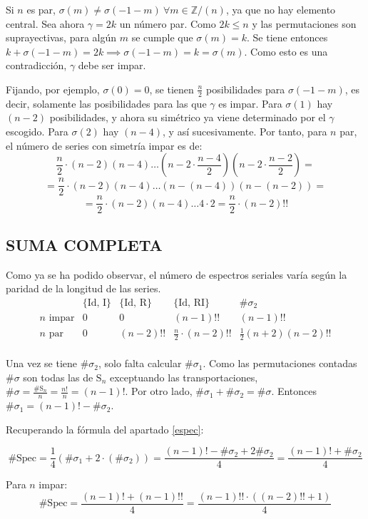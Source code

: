 		Si $n$ es par, $\sigma(m)\neq\sigma(-1-m)\ \forall m\in \mathbb{Z} / (n)$, ya que no hay elemento central. Sea ahora $\gamma=2k$ un número par. Como $2k\leq n$ y las permutaciones son suprayectivas, para algún $m$ se cumple que $\sigma(m)=k$. Se tiene entonces $k+\sigma(-1-m)=2k\implies\sigma(-1-m)=k=\sigma(m)$. Como esto es una contradicción, $\gamma$ debe ser impar.
		
		Fijando, por ejemplo, $\sigma(0)=0$, se tienen $\frac{n}{2}$ posibilidades para $\sigma(-1-m)$, es decir, solamente las posibilidades para las que $\gamma$ es impar. Para $\sigma(1)$ hay $(n-2)$ posibilidades, y ahora su simétrico ya viene determinado por el $\gamma$ escogido. Para $\sigma(2)$ hay $(n-4)$, y así sucesivamente. \cite{reiner} Por tanto, para $n$ par, el número de series con simetría impar es de: 
		$$\frac{n}{2}\cdot(n-2)(n-4)\ldots(n-2\cdot\frac{n-4}{2})(n-2\cdot\frac{n-2}{2})=$$
		$$=\frac{n}{2}\cdot(n-2)(n-4)\ldots(n-(n-4))(n-(n-2))=$$
		$$=\frac{n}{2}\cdot(n-2)(n-4)\ldots4\cdot2=\frac{n}{2}\cdot(n-2)!!$$
			\newpage
	\subsection{SUMA COMPLETA}
		\def\arraystretch{1.5}
		Como ya se ha podido observar, el número de espectros seriales varía según la paridad de la longitud de las series.		
		$$\begin{array}{c|c|c|c|c}
		&\{\text{Id, I}\}&\{\text{Id, R}\}&\{\text{Id, RI}\}&\#\sigma_2\\\hline
		n\text{ impar}&0&0&(n-1)!!&(n-1)!!\\\hline
		n\text{ par}&0&(n-2)!!&\frac{n}{2}\cdot(n-2)!!&\frac{1}{2}(n+2)(n-2)!!\\
		\end{array}$$
		\def\arraystretch{1}
		
		Una vez se tiene $\#\sigma_2$, solo falta calcular $\#\sigma_1$. Como las permutaciones contadas $\#\sigma$ son todas las de $\text{S}_n$ exceptuando las transportaciones, $\#\sigma=\frac{\#\text{S}_n}{n}=\frac{n!}{n}=(n-1)!$. Por otro lado, $\#\sigma_1 +\#\sigma_2=\#\sigma$. Entonces $\#\sigma_1=(n-1)!-\#\sigma_2$.
		
		Recuperando la fórmula del apartado \ref{espec}:
		
		$$\#\text{Spec}=\frac{1}{4}\left(\#\sigma_1+2\cdot(\#\sigma_2)\right)=\frac{(n-1)!-\#\sigma_2+2\#\sigma_2}{4}=\frac{(n-1)!+\#\sigma_2}{4}$$
		
		Para $n$ impar:
		$$\#\text{Spec}=\frac{(n-1)!+(n-1)!!}{4}=\frac{(n-1)!!\cdot\left((n-2)!!+1\right)}{4}$$
		
